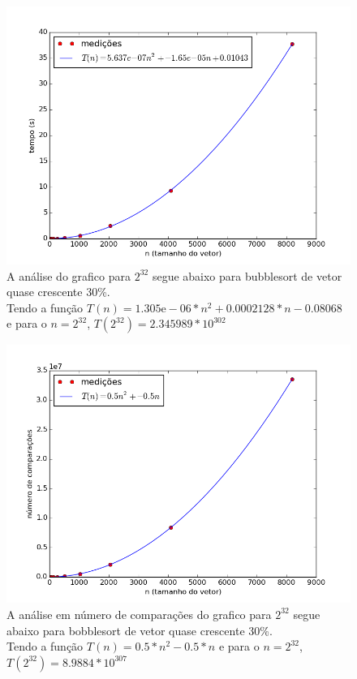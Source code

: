 \documentclass[12pt,a4paper,twoside]{report}
\begin{document}
\clearpage


\begin{figure}[ht]
\centering \includegraphics[scale=0.8]{../bolha/imagens/bolhaQuaseCresc300.png}
\caption{A análise do grafico para $2^{32}$ segue abaixo para bubblesort de vetor quase crescente 30\%.\\
Tendo a função $T(n) = 1.305\mathrm{e}-06*n^2+0.0002128*n-0.08068$ e para o $n =2^{32}$, $T(2^{32}) = 2.345989 * 10^{302}$}
\label{fig:bolhaQuaseCresc300}
\end{figure}

\begin{figure}[ht]
\centering \includegraphics[scale=0.8]{../bolha/imagens/bolhaQuaseCresc301.png}
\caption{A análise em número de comparações do grafico para $2^{32}$ segue abaixo para bobblesort de vetor quase crescente 30\%.\\
Tendo a função $T(n) = 0.5*n^2 - 0.5*n$ e para o $n =2^{32}$, $T(2^{32}) = 8.9884 * 10^{307}$}
\label{fig:bolhaQuaseCresc301}
\end{figure}
\end{document}
